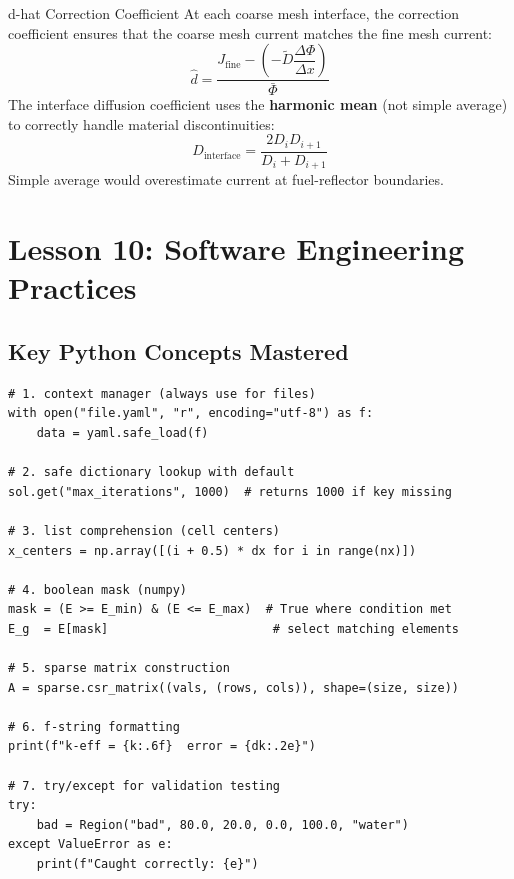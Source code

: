 \documentclass[12pt,a4paper]{article}
\begin{document}
\begin{physicsbox}{d-hat Correction Coefficient}
At each coarse mesh interface, the correction coefficient ensures that
the coarse mesh current matches the fine mesh current:
\begin{equation}
\hat{d} = \frac{J_{\text{fine}} -
               \left(-\tilde{D}\dfrac{\Delta\Phi}{\Delta x}\right)}{\bar{\Phi}}
\end{equation}
The interface diffusion coefficient uses the \textbf{harmonic mean}
(not simple average) to correctly handle material discontinuities:
\begin{equation}
D_{\text{interface}} = \frac{2D_i D_{i+1}}{D_i + D_{i+1}}
\end{equation}
Simple average would overestimate current at fuel-reflector boundaries.
\end{physicsbox}

\section{Lesson 10: Software Engineering Practices}

\subsection{Key Python Concepts Mastered}

\begin{lstlisting}[caption={Important Python Patterns Used Throughout}]
# 1. context manager (always use for files)
with open("file.yaml", "r", encoding="utf-8") as f:
    data = yaml.safe_load(f)

# 2. safe dictionary lookup with default
sol.get("max_iterations", 1000)  # returns 1000 if key missing

# 3. list comprehension (cell centers)
x_centers = np.array([(i + 0.5) * dx for i in range(nx)])

# 4. boolean mask (numpy)
mask = (E >= E_min) & (E <= E_max)  # True where condition met
E_g  = E[mask]                       # select matching elements

# 5. sparse matrix construction
A = sparse.csr_matrix((vals, (rows, cols)), shape=(size, size))

# 6. f-string formatting
print(f"k-eff = {k:.6f}  error = {dk:.2e}")

# 7. try/except for validation testing
try:
    bad = Region("bad", 80.0, 20.0, 0.0, 100.0, "water")
except ValueError as e:
    print(f"Caught correctly: {e}")
\end{lstlisting}
\end{document}

